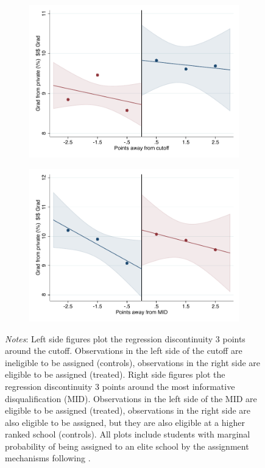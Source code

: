 \documentclass[oneside,11pt]{article}
\begin{document}
\begin{figure}[H]
\begin{center}
    \begin{subfigure}{0.475\textwidth}
        \centering
        \includegraphics[width=\textwidth]{04_Figures/rd_plot_tau_ENLACE_Privado_pdelta3.pdf}
    \end{subfigure}
    \begin{subfigure}{0.475\textwidth}
        \centering
        \includegraphics[width=\textwidth]{04_Figures/rd_plot_mid_ENLACE_Privado_pdelta3.pdf}
    \end{subfigure}
    \end{center}
    
\footnotesize
\textit{Notes}: Left side figures plot the regression discontinuity 3 points around the cutoff. Observations in the left side of the cutoff are ineligible to be assigned (controls), observations in the right side are eligible to be assigned (treated). Right side figures plot the regression discontinuity 3 points around the most informative disqualification (MID). Observations in the left side of the MID are eligible to be assigned (treated), observations in the right side are also eligible to be assigned, but they are also eligible at a higher ranked school (controls). All plots include students with marginal probability of being assigned to an elite school by the assignment mechanisms following \citet{abdulkadirouglu2022breaking}. 
\end{figure}
\end{document}
